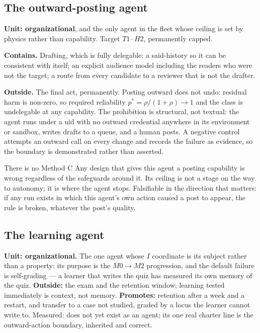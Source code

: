 \subsection{The outward-posting agent}\label{sec:social}

\textbf{Unit: organizational}, and the only agent in the fleet whose ceiling is set by physics rather than capability. Target $T1\cdot H2$, permanently capped.

\textbf{Contains.} Drafting, which is fully delegable; a said-history so it can be consistent with itself; an explicit audience model including the readers who were not the target; a route from every candidate to a reviewer that is not the drafter.

\textbf{Outside.} The final act, permanently. Posting outward does not undo: residual harm is non-zero, so required reliability $p^{*} = \rho/(1+\rho) \to 1$ and the class is undelegable at any capability. The prohibition is structural, not textual: the agent runs under a uid with no outward credential anywhere in its environment or sandbox, writes drafts to a queue, and a human posts. A negative control attempts an outward call on every change and records the failure as evidence, so the boundary is demonstrated rather than asserted.

\begin{cautionbox}{There is no Method C}
Any design that gives this agent a posting capability is wrong regardless of the safeguards around it. Its ceiling is not a stage on the way to autonomy; it is where the agent stops. Falsifiable in the direction that matters: if any run exists in which this agent's own action caused a post to appear, the rule is broken, whatever the post's quality.
\end{cautionbox}

\subsection{The learning agent}

\textbf{Unit: organizational.} The one agent whose $I$ coordinate is its subject rather than a property: its purpose is the $M0\to M2$ progression, and the default failure is self-grading --- a learner that writes the quiz has measured its own memory of the quiz. \textbf{Outside:} the exam and the retention window; learning tested immediately is context, not memory. \textbf{Promotes:} retention after a week and a restart, and transfer to a case not studied, graded by a locus the learner cannot write to. Measured: does not yet exist as an agent; its one real charter line is the outward-action boundary, inherited and correct.

